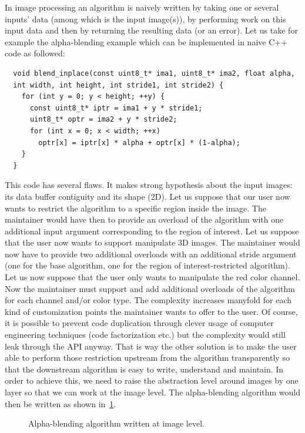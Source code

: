 In image processing an algorithm is naively written by taking one or several inputs' data (among which is the input
image(s)),  by performing work on this input data and then by returning the resulting data (or an error). Let us take
for example the alpha-blending example which can be implemented in naive C++ code as followed:
\begin{verbatim}
  void blend_inplace(const uint8_t* ima1, uint8_t* ima2, float alpha,
  int width, int height, int stride1, int stride2) {
    for (int y = 0; y < height; ++y) {
      const uint8_t* iptr = ima1 + y * stride1;
      uint8_t* optr = ima2 + y * stride2;
      for (int x = 0; x < width; ++x)
        optr[x] = iptr[x] * alpha + optr[x] * (1-alpha);
    }
  }
\end{verbatim}

This code has several flaws. It makes strong hypothesis about the input images: its data buffer contiguity and its shape
(2D). Let us suppose that our user now wants to restrict the algorithm to a specific region inside the image. The
maintainer would have then to provide an overload of the algorithm with one additional input argument corresponding to
the region of interest. Let us suppose that the user now wants to support manipulate 3D images. The maintainer would now
have to provide two additional overloads with an additional stride argument (one for the base algorithm, one for the
region of interest-restricted algorithm). Let us now suppose that the user only wants to manipulate the red color
channel. Now the maintainer must support and add additional overloads of the algorithm for each channel and/or color
type. The complexity increases manyfold for each kind of customization points the maintainer wants to offer to the user.
Of course, it is possible to prevent code duplication through clever usage of computer engineering techniques (code
factorization etc.) but the complexity would still leak through the API anyway. That is way the other solution is to
make the user able to perform those restriction upstream from the algorithm transparently so that the downstream
algorithm is easy to write, understand and maintain. In order to achieve this, we need to raise the abstraction level
around images by one layer so that we can work at the image level. The alpha-blending algorithm would then be written as
shown in~\cref{summary:fig:view.alphablend}.

\begin{figure}[htbp]
  \centering
  

  \caption[]{Alpha-blending algorithm written at image level.}
  \label{summary:fig:view.alphablend}
\end{figure}

